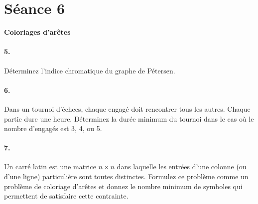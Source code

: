 \section{Séance 6}
\textbf{Coloriages d'arêtes}

\paragraph{5. } Déterminez l'indice chromatique du graphe de Pétersen.

\paragraph{6. } Dans un tournoi d'échecs, chaque engagé doit rencontrer tous les autres. Chaque partie dure une heure. Déterminez la durée minimum du tournoi dans le cas où le nombre d'engagés est 3, 4, ou 5.

\paragraph{7. } Un carré latin est une matrice $n \times n$ dans laquelle les entrées d'une colonne (ou d'une ligne) particulière sont toutes distinctes. Formulez ce problème comme un problème de coloriage d'arêtes et donnez le nombre minimum de symboles qui permettent de satisfaire cette contrainte.
